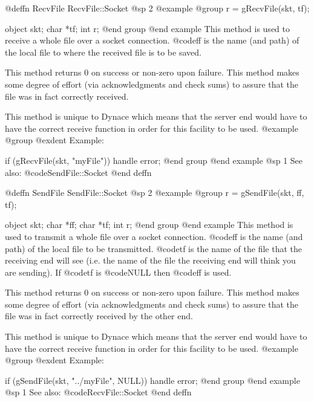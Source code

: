 @deffn {RecvFile} RecvFile::Socket
@sp 2
@example
@group
r = gRecvFile(skt, tf);

object  skt;
char    *tf;
int     r;
@end group
@end example
This method is used to receive a whole file over a socket connection.
@code{ff} is the name (and path) of the local file to where the received
file is to be saved.

This method returns 0 on success or non-zero upon failure.  This method
makes some degree of effort (via acknowledgments and check sums) to assure
that the file was in fact correctly received.

This method is unique to Dynace which means that the server end would
have to have the correct receive function in order for this facility
to be used.
@example
@group
@exdent Example:
 
if (gRecvFile(skt, "myFile"))
      handle error;
@end group
@end example
@sp 1
See also:  @code{SendFile::Socket}
@end deffn

















@deffn {SendFile} SendFile::Socket
@sp 2
@example
@group
r = gSendFile(skt, ff, tf);

object  skt;
char    *ff;
char    *tf;
int     r;
@end group
@end example
This method is used to transmit a whole file over a socket connection.
@code{ff} is the name (and path) of the local file to be transmitted.
@code{tf} is the name of the file that the receiving end will see
(i.e. the name of the file the receiving end will think you are
sending).  If @code{tf} is @code{NULL} then @code{ff} is used.

This method returns 0 on success or non-zero upon failure.  This method
makes some degree of effort (via acknowledgments and check sums) to assure
that the file was in fact correctly received by the other end.

This method is unique to Dynace which means that the server end would
have to have the correct receive function in order for this facility
to be used.
@example
@group
@exdent Example:
 
if (gSendFile(skt, "../myFile", NULL))
      handle error;
@end group
@end example
@sp 1
See also:  @code{RecvFile::Socket}
@end deffn









